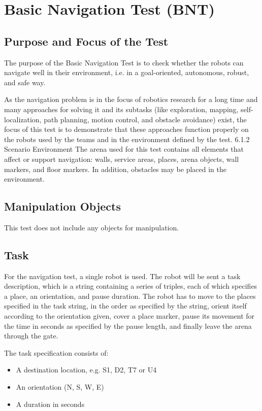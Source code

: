 \section{Basic Navigation Test (BNT)}

\subsection{Purpose and Focus of the Test}
The purpose of the Basic Navigation Test is to check whether the robots can navigate well in their environment, i.e. in a goal-oriented, autonomous, robust, and safe way. 
\par
As the navigation problem is in the focus of robotics research for a long time and many approaches for solving it and its subtasks (like exploration, mapping, self-localization, path planning, motion control, and obstacle avoidance) exist, the focus of this test is to demonstrate that these approaches function properly on the robots used by the teams and in the environment defined by the test.
6.1.2 Scenario Environment
The arena used for this test contains all elements that affect or support navigation: walls, service areas, places, arena objects, wall markers, and floor markers. In addition, obstacles may be placed in the environment. 
\par
\subsection{Manipulation Objects}
This test does not include any objects for manipulation.
\subsection{Task}
For the navigation test, a single robot is used. The robot will be sent a task description, which is a string containing a series of triples, each of which specifies a place, an orientation, and pause duration. The robot has to move to the places specified in the task string, in the order as specified by the string, orient itself according to the orientation given, cover a place marker, pause its movement for the time in seconds as specified by the pause length, and finally leave the arena through the gate.

The task specification consists of: 

\begin{itemize}
	\item A destination location, e.g. S1, D2, T7 or U4
	\item An orientation (N, S, W, E)
	\item A duration in seconds
\end{itemize}


